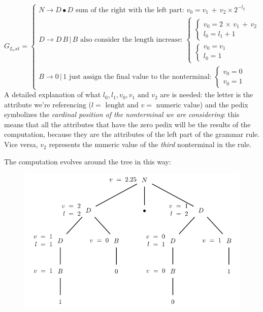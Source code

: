 				\begin{equation}
					G_{L_ext} = 
					\begin{cases}
						N \rightarrow D \bullet D \text{ sum of the right with the left part: } v_0 = v_1\,+\,v_2\times 2^{-l_2} \\
						D \rightarrow D \, B \, \vert \, B \text{ also consider the length increase: } 
							\begin{cases}
								\begin{cases}
									v_0 = 2 \,\times\, v_1\,+\,v_2 \\
									l_0 = l_1 + 1
								\end{cases}\\
								\begin{cases}
									v_0 = v_1 \\
									l_0 = 1
								\end{cases}
							\end{cases}\\
						B \rightarrow 0 \, \vert \, 1 \text{ just assign the final value to the nonterminal: } 
							\begin{cases}
								v_0 = 0\\
								v_0 = 1
							\end{cases}
					\end{cases}
				\end{equation}
				A detailed explanation of what $l_0, l_1, v_0, v_1 \text{ and } v_2$ are is needed: the letter is the attribute we're referencing 
				($l = \text{ lenght and } v = \text{ numeric value}$) and the pedix symbolizes the \emph{cardinal position of the nonterminal we are considering}: 
				this means that all the attributes that have the zero pedix will be the results of the computation, because they are the attributes of the left part 
				of the grammar rule. Vice versa, $v_2$ represents the numeric value of the \emph{third} nonterminal in the rule.

				The computation evolves around the tree in this way:
				\begin{figure}[H]
					\centering
					\includegraphics[width = \textwidth]{./images/decoratedTree.png}
				\end{figure}
				
